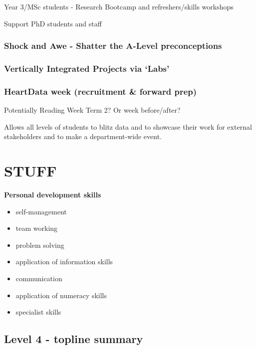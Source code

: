 \documentclass[
  11pt,
  letterpaper,
  oneside,
  open=any]{scrbook}
\begin{document}
Year 3/MSc students - Research Bootcamp and refreshers/skills workshops

Support PhD students and staff

\hypertarget{shock-and-awe---shatter-the-a-level-preconceptions}{%
\subsection{Shock and Awe - Shatter the A-Level
preconceptions}\label{shock-and-awe---shatter-the-a-level-preconceptions}}

\hypertarget{vertically-integrated-projects-via-labs}{%
\subsection{Vertically Integrated Projects via
`Labs'}\label{vertically-integrated-projects-via-labs}}

\hypertarget{heartdata-week-recruitment-forward-prep}{%
\subsection{HeartData week (recruitment \& forward
prep)}\label{heartdata-week-recruitment-forward-prep}}

Potentially Reading Week Term 2? Or week before/after?

Allows all levels of students to blitz data and to showcase their work
for external stakeholders and to make a department-wide event.


\hypertarget{stuff}{%
\chapter{STUFF}\label{stuff}}

\textbf{Personal development skills}

\begin{itemize}
\item
  self-management
\item
  team working
\item
  problem solving
\item
  application of information skills
\item
  communication
\item
  application of numeracy skills
\item
  specialist skills
\end{itemize}

\hypertarget{level-4---topline-summary}{%
\section{Level 4 - topline summary}\label{level-4---topline-summary}}
\end{document}
